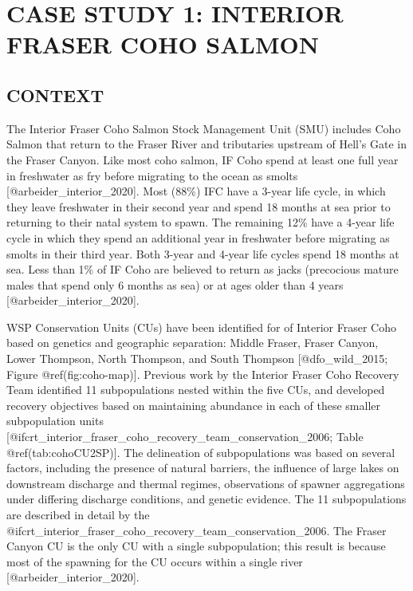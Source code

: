 \documentclass[
]{article}
\author{}
\date{\vspace{-2.5em}}
\begin{document}
\hypertarget{case-study-1-interior-fraser-coho-salmon}{%
\section{CASE STUDY 1: INTERIOR FRASER COHO
SALMON}\label{case-study-1-interior-fraser-coho-salmon}}

\hypertarget{context}{%
\subsection{CONTEXT}\label{context}}

The Interior Fraser Coho Salmon Stock Management Unit (SMU) includes
Coho Salmon that return to the Fraser River and tributaries upstream of
Hell's Gate in the Fraser Canyon. Like most coho salmon, IF Coho spend
at least one full year in freshwater as fry before migrating to the
ocean as smolts {[}@arbeider\_interior\_2020{]}. Most (88\%) IFC have a
3-year life cycle, in which they leave freshwater in their second year
and spend 18 months at sea prior to returning to their natal system to
spawn. The remaining 12\% have a 4-year life cycle in which they spend
an additional year in freshwater before migrating as smolts in their
third year. Both 3-year and 4-year life cycles spend 18 months at sea.
Less than 1\% of IF Coho are believed to return as jacks (precocious
mature males that spend only 6 months as sea) or at ages older than 4
years {[}@arbeider\_interior\_2020{]}.

WSP Conservation Units (CUs) have been identified for of Interior Fraser
Coho based on genetics and geographic separation: Middle Fraser, Fraser
Canyon, Lower Thompson, North Thompson, and South Thompson
{[}@dfo\_wild\_2015; Figure @ref(fig:coho-map){]}. Previous work by the
Interior Fraser Coho Recovery Team identified 11 subpopulations nested
within the five CUs, and developed recovery objectives based on
maintaining abundance in each of these smaller subpopulation units
{[}@ifcrt\_interior\_fraser\_coho\_recovery\_team\_conservation\_2006;
Table @ref(tab:cohoCU2SP){]}. The delineation of subpopulations was
based on several factors, including the presence of natural barriers,
the influence of large lakes on downstream discharge and thermal
regimes, observations of spawner aggregations under differing discharge
conditions, and genetic evidence. The 11 subpopulations are described in
detail by the
@ifcrt\_interior\_fraser\_coho\_recovery\_team\_conservation\_2006. The
Fraser Canyon CU is the only CU with a single subpopulation; this result
is because most of the spawning for the CU occurs within a single river
{[}@arbeider\_interior\_2020{]}.
\end{document}
